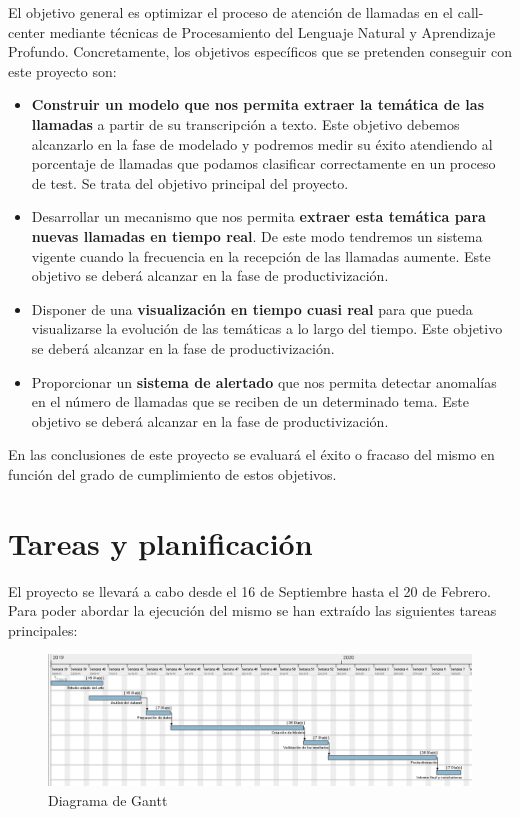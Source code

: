 El objetivo general es optimizar el proceso de atención de llamadas en el call-center mediante técnicas de Procesamiento del Lenguaje Natural y Aprendizaje Profundo. Concretamente, los objetivos específicos que se pretenden conseguir con este proyecto son: 

\begin{itemize}
	\item \textbf{Construir un modelo que nos permita extraer la temática de las llamadas} a partir de su transcripción a texto. Este objetivo debemos alcanzarlo en la fase de modelado y podremos medir su éxito atendiendo al porcentaje de llamadas que podamos clasificar correctamente en un proceso de test. Se trata del objetivo principal del proyecto.
	\item Desarrollar un mecanismo que nos permita \textbf{extraer esta temática para nuevas llamadas en tiempo real}. De este modo tendremos un sistema vigente cuando la frecuencia en la recepción de las llamadas aumente. Este objetivo se deberá alcanzar en la fase de productivización. 
	\item Disponer de una\textbf{ visualización en tiempo cuasi real} para que pueda visualizarse la evolución de las temáticas a lo largo del tiempo. Este objetivo se deberá alcanzar en la fase de productivización. 
	\item Proporcionar un \textbf{sistema de alertado} que nos permita detectar anomalías en el número de llamadas que se reciben de un determinado tema. Este objetivo se deberá alcanzar en la fase de productivización.
\end{itemize}

En las conclusiones de este proyecto se evaluará el éxito o fracaso del mismo en función del grado de cumplimiento de estos objetivos.

\section{Tareas y planificación}
\label{section:intro:planificacion}
El proyecto se llevará a cabo desde el 16 de Septiembre hasta el 20 de Febrero. Para poder abordar la ejecución del  mismo se han extraído las siguientes tareas principales: 


\begin{figure}[!ht]
	\centering
	\includegraphics[width=\textwidth]{images/intro/gantt}
	\caption{Diagrama de Gantt}
	\label{fig:gantt}
\end{figure}


